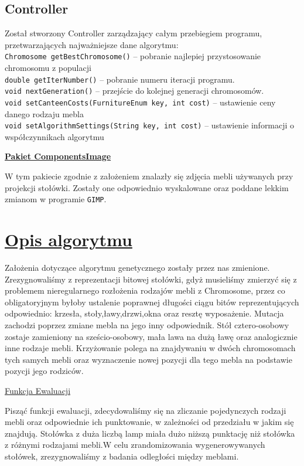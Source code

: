 \documentclass{article}
\begin{document}
\subsection{Controller}
\vspace{1mm}
\indent Został stworzony Controller zarządzający całym przebiegiem programu, przetwarzających najważniejsze dane algorytmu:\\
\verb|Chromosome getBestChromosome()| -- pobranie najlepiej przystosowanie chromosomu z populacji\\
\verb|double getIterNumber()| -- pobranie numeru iteracji programu.\\
\verb|void nextGeneration()| -- przejście do kolejnej generacji chromosomów.\\
\verb|void setCanteenCosts(FurnitureEnum key, int cost)| -- ustawienie ceny danego rodzaju mebla\\
\verb|void setAlgorithmSettings(String key, int cost)| -- ustawienie informacji o współczynnikach algorytmu\\

\begin{center}
\vspace{3mm}
\underline{\huge\textbf{{Pakiet ComponentsImage}}}
\end{center}
\indent W tym pakiecie zgodnie z założeniem znalazły się zdjęcia mebli używanych przy projekcji stołówki. Zostały one odpowiednio wyskalowane oraz poddane lekkim zmianom w programie \verb|GIMP|.
\section{\textbf{\underline{Opis algorytmu}}}

\indent  Założenia dotyczące algorytmu genetycznego zostały przez nas zmienione. Zrezygnowaliśmy z reprezentacji bitowej stołówki, gdyż musieliśmy zmierzyć się z problemem nieregularnego rozłożenia rodzajów mebli z Chromosome, przez co obligatoryjnym byłoby ustalenie poprawnej długości ciągu bitów reprezentujących odpowiednio: krzesła, stoły,ławy,drzwi,okna oraz resztę wyposażenie. Mutacja zachodzi poprzez zmiane mebla na jego inny odpowiednik. Stół cztero-osobowy zostaje zamieniony na sześcio-osobowy, mała lawa na dużą ławę oraz analogicznie inne rodzaje mebli. Krzyżowanie polega na znajdywaniu w dwóch chromosomach tych samych mebli oraz wyznaczenie nowej pozycji dla tego mebla na podstawie pozycji jego rodziców.\\
\begin{center}
\underline{Funkcja Ewaluacji}
\end{center}
\indent Pisząć funkcji ewaluacji, zdecydowaliśmy się na zliczanie pojedynczych rodzaji mebli oraz odpowiednie ich punktowanie, w zależności od przedziału w jakim się znajdują. Stołówka z duża liczbą lamp miała dużo niższą punktację niż stołówka z różnymi rodzajami mebli.W celu zrandomizowania wygenerowywanych stołówek, zrezygnowaliśmy z badania odległości między meblami.
\newpage
\end{document}
